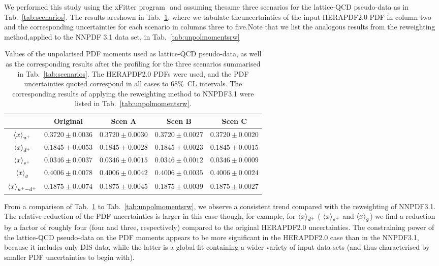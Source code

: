 We​ ​performed​ ​this​ ​study​ ​using​ ​the​ ​xFitter​ ​program​ ​\cite{Alekhin:2014irh}​ ​and​ ​assuming​ ​the​ ​same​ ​three
scenarios​ ​for​ ​the​ ​lattice-QCD​ ​pseudo-data​ ​as​ ​in​ ​Tab.~\ref{tab:scenarios}.​ ​The​ ​results​ ​are​ ​shown​ ​in​ ​Tab.~\ref{tab:unpolmomentsProf},
where​ ​we​ ​tabulate​ ​the​ ​uncertainties​ ​of​ ​the​ ​input​ ​HERAPDF2.0​ ​PDF​ ​in​ ​column​ ​two​ ​and​ ​the
corresponding​ ​uncertainties​ ​for​ ​each​ ​scenario​ ​in​ ​columns​ ​three​ ​to​ ​five.​ ​Note​ ​that​ ​we​ ​list​ ​the
analogous​ ​results​ ​from​ ​the​ ​reweighting​ ​method,​ ​applied​ ​to​ ​the​ ​NNPDF​ ​3.1​ ​data​ ​set,​ ​in​ ​Tab.~\ref{tab:unpolmomentsrw}


\begin{table}[h]
  \centering
  \renewcommand{\arraystretch}{1.3} 
\begin{tabular}{c||c|c|c|c}
  \hline &  Original  & Scen A  &  Scen B  &  Scen C  \\
  \hline
  \hline
  $\left\langle x\right\rangle_{u^+}$     &  $0.3720\pm 0.0036$  &  $0.3720\pm 0.0030$  &  $0.3720\pm 0.0027$  &  $0.3720\pm 0.0020$ \\
  $\left\langle x\right\rangle_{d^+}$     &  $0.1845\pm 0.0053$  &  $0.1845\pm 0.0028$  &  $0.1845\pm 0.0023$  &  $0.1845\pm 0.0015$ \\
  $\left\langle x\right\rangle_{s^+}$     &  $0.0346\pm 0.0037$  &  $0.0346\pm 0.0015$  &  $0.0346\pm 0.0012$  &  $0.0346\pm 0.0009$ \\
  $\left\langle x\right\rangle_{g}$       &  $0.4006\pm 0.0078$  &  $0.4006\pm 0.0042$  &  $0.4006\pm 0.0035$  &  $0.4006\pm 0.0024$ \\
  $\left\langle x\right\rangle_{u^+-d^+}$ &  $0.1875\pm 0.0074$  &  $0.1875\pm 0.0045$  &  $0.1875\pm 0.0039$  &  $0.1875\pm 0.0027$ \\
  \hline
\end{tabular}
\caption{\small Values of the unpolarised PDF moments
  used as lattice-QCD pseudo-data, as well as the corresponding results
  after the profiling  for the
three scenarios summarised in Tab.~\ref{tab:scenarios}.
%
The HERAPDF2.0 PDFs were used, and the PDF uncertainties quoted correspond in all cases to 68\%~CL intervals.
%
The corresponding results of applying the reweighting method
to NNPDF3.1 were listed in Tab.~\ref{tab:unpolmomentsrw}.
\label{tab:unpolmomentsProf}
}
\end{table}

From a comparison of Tab.~\ref{tab:unpolmomentsProf} to Tab.~\ref{tab:unpolmomentsrw},
we observe a consistent trend compared with the reweighting of NNPDF3.1.
%
The relative reduction of the PDF uncertainties is larger
in this case though, for example, for $\left\langle x\right\rangle_{d^+}$ ( $\left\langle x\right\rangle_{s^+}$
and  $\left\langle x\right\rangle_g$) we find a reduction by a factor of roughly
four (four and three, respectively) compared to the original
HERAPDF2.0 uncertainties.
%
The constraining power of the lattice-QCD pseudo-data
on the PDF moments appears to be more significant in the
HERAPDF2.0 case than in the NNPDF3.1, because it includes only DIS data, while the latter
is a global fit containing a wider variety of
input data sets (and thus characterised by smaller
PDF uncertainties to begin with).

